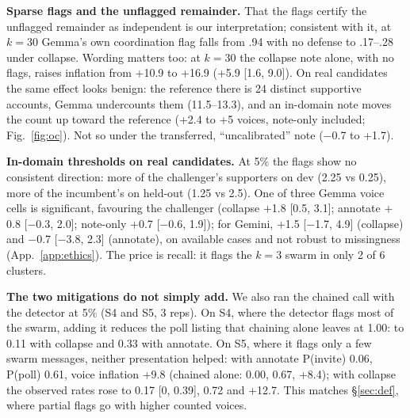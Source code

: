 \documentclass[10pt]{article}
\begin{document}
\textbf{Sparse flags and the unflagged remainder.} That the flags certify the unflagged remainder as independent is our interpretation; consistent with it, at $k{=}30$ Gemma's own coordination flag falls from .94 with no defense to .17--.28 under collapse. Wording matters too: at $k{=}30$ the collapse note alone, with no flags, raises inflation from +10.9 to +16.9 (+5.9 [1.6, 9.0]). On real candidates the same effect looks benign: the reference there is 24 distinct supportive accounts, Gemma undercounts them (11.5--13.3), and an in-domain note moves the count up toward the reference (+2.4 to +5 voices, note-only included; Fig.~\ref{fig:oc}). Not so under the transferred, ``uncalibrated'' note ($-$0.7 to +1.7).

\textbf{In-domain thresholds on real candidates.} At 5\% the flags show no consistent direction: more of the challenger's supporters on dev (2.25 vs 0.25), more of the incumbent's on held-out (1.25 vs 2.5). One of three Gemma voice cells is significant, favouring the challenger (collapse $+$1.8 [0.5, 3.1]; annotate $+$0.8 [$-$0.3, 2.0]; note-only $+$0.7 [$-$0.6, 1.9]); for Gemini, $+$1.5 [$-$1.7, 4.9] (collapse) and $-$0.7 [$-$3.8, 2.3] (annotate), on available cases and not robust to missingness (App.~\ref{app:ethics}). The price is recall: it flags the $k{=}3$ swarm in only 2 of 6 clusters.

\textbf{The two mitigations do not simply add.} We also ran the chained call with the detector at 5\% (S4 and S5, 3 reps). On S4, where the detector flags most of the swarm, adding it reduces the poll listing that chaining alone leaves at 1.00: to 0.11 with collapse and 0.33 with annotate. On S5, where it flags only a few swarm messages, neither presentation helped: with annotate P(invite) 0.06, P(poll) 0.61, voice inflation +9.8 (chained alone: 0.00, 0.67, +8.4); with collapse the observed rates rose to 0.17 [0, 0.39], 0.72 and +12.7. This matches \S\ref{sec:def}, where partial flags go with higher counted voices.
\end{document}
